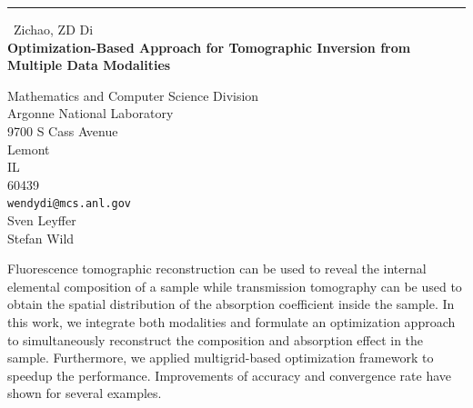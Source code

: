 \documentclass{report}
\begin{document}
\begin{center}
\rule{6in}{1pt} \
{\large Zichao, ZD Di \\
{\bf Optimization-Based Approach for Tomographic Inversion from Multiple Data Modalities}}

Mathematics and Computer Science Division \\ Argonne National Laboratory \\ 9700 S Cass Avenue \\ Lemont \\ IL \\ 60439
\\
{\tt wendydi@mcs.anl.gov}\\
Sven Leyffer\\
Stefan Wild\end{center}

Fluorescence tomographic reconstruction can be used to reveal the internal
elemental composition of a sample while transmission tomography can be used
to obtain the spatial distribution of the absorption coefficient inside the sample.
In this work, we integrate both modalities and formulate an optimization
approach to simultaneously reconstruct the composition and absorption effect in
the sample. Furthermore, we applied multigrid-based optimization
framework to speedup the performance. Improvements of accuracy and
convergence rate have shown for several
examples.
\end{document}
